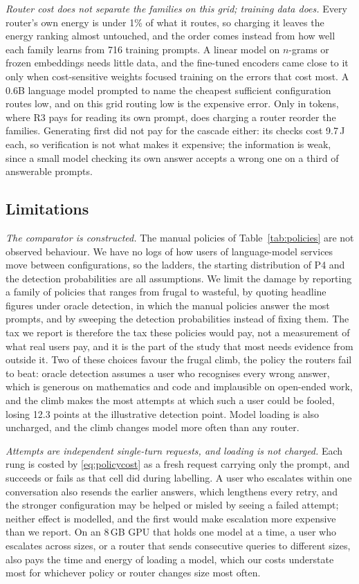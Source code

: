 \emph{Router cost does not separate the families on this grid; training data
does.} Every router's own energy is under 1\% of what it routes, so charging
it leaves the energy ranking almost untouched, and the order comes instead
from how well each family learns from 716 training prompts. A linear model on
$n$-grams or frozen embeddings needs little data, and the fine-tuned encoders
came close to it only when cost-sensitive weights focused training on the
errors that cost most. A 0.6B language model prompted to name the cheapest
sufficient configuration routes low, and on this grid routing low is the
expensive error. Only in tokens, where R3 pays for reading its own prompt,
does charging a router reorder the families. Generating first did not pay for
the cascade either: its checks cost 9.7\,J each, so verification is not what
makes it expensive; the information is weak, since a small model checking its
own answer accepts a wrong one on a third of answerable prompts.

\subsection{Limitations}
\label{sec:limitations}

\emph{The comparator is constructed.} The manual policies of
Table~\ref{tab:policies} are not observed behaviour. We have no logs of how
users of language-model services move between configurations, so the ladders,
the starting distribution of P4 and the detection probabilities are all
assumptions. We limit the damage by reporting a family of policies that
ranges from frugal to wasteful, by quoting headline figures under oracle
detection, in which the manual policies answer the most prompts, and by
sweeping the detection probabilities instead of fixing them. The tax we
report is therefore the tax these policies would pay, not a measurement of
what real users pay, and it is the part of the study that most needs evidence
from outside it. Two of these choices favour the frugal climb, the policy the
routers fail to beat: oracle detection assumes a user who recognises every
wrong answer, which is generous on mathematics and code and implausible on
open-ended work, and the climb makes the most attempts at which such a user
could be fooled, losing 12.3 points at the illustrative detection point.
Model loading is also uncharged, and the climb changes model more often than
any router.

\emph{Attempts are independent single-turn requests, and loading is not
charged.} Each rung is costed by \eqref{eq:policycost} as a fresh request
carrying only the prompt, and succeeds or fails as that cell did during
labelling. A user who escalates within one conversation also resends the
earlier answers, which lengthens every retry, and the stronger configuration
may be helped or misled by seeing a failed attempt; neither effect is
modelled, and the first would make escalation more expensive than we report.
On an 8\,GB GPU that holds one model at a time, a user who escalates across
sizes, or a router that sends consecutive queries to different sizes, also
pays the time and energy of loading a model, which our costs understate most
for whichever policy or router changes size most often.

